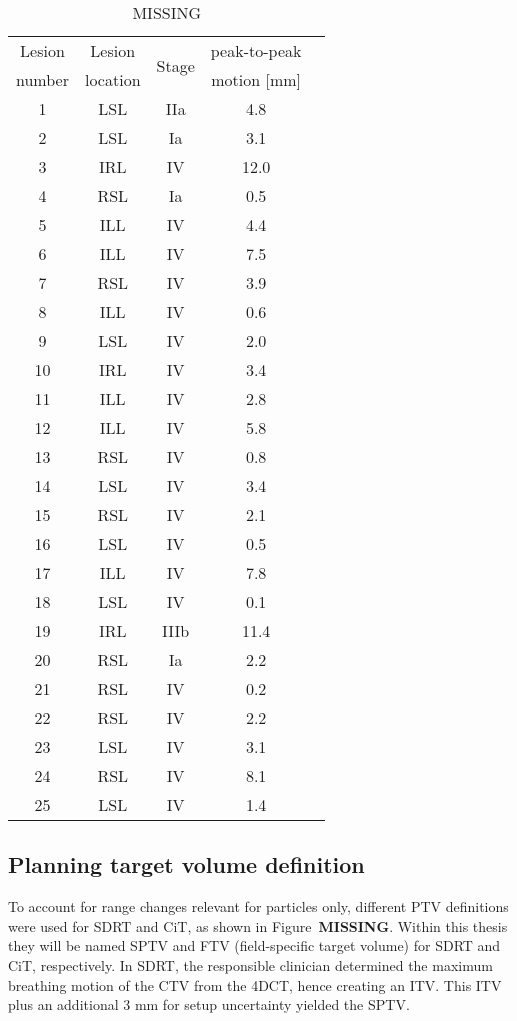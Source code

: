 \documentclass[type=dr, dr=rernat, accentcolor=tud7b,colorbacktitle, bigchapter, openright, twoside, 12pt ]{tudthesis}
\begin{document}
\begin{table}[H]
  \centering
  \caption{MISSING}
  \begin{tabular}{|c|c|c|c|c|}
    \hline\hline
    Lesion & Lesion & \multirow{2}{*}{Stage} &
    peak-to-peak \\
    number & location & & motion [mm] \\
    \hline
    1 & LSL & IIa & 4.8  \\
    2 & LSL & Ia & 3.1 \\
    3 & IRL & IV & 12.0 \\
    4 & RSL & Ia & 0.5 \\
    5 & ILL & IV & 4.4 \\
    6 & ILL & IV & 7.5 \\
    7 & RSL & IV & 3.9 \\
    8 & ILL & IV & 0.6 \\
    9 & LSL & IV & 2.0 \\
    10 & IRL & IV & 3.4 \\
    11 & ILL & IV & 2.8 \\
    12 & ILL & IV & 5.8 \\
    13 & RSL & IV & 0.8 \\
    14 & LSL & IV & 3.4 \\
    15 & RSL & IV & 2.1 \\
    16 & LSL & IV & 0.5 \\
    17 & ILL & IV & 7.8 \\
    18 & LSL & IV & 0.1 \\
    19 & IRL & IIIb & 11.4 \\
    20 & RSL & Ia & 2.2 \\
    21 & RSL & IV & 0.2 \\
    22 & RSL & IV & 2.2 \\
    23 & LSL & IV & 3.1 \\
    24 & RSL & IV & 8.1 \\
    25 & LSL & IV & 1.4 \\
    \hline\hline
  \end{tabular}
  \label{tab:patdata}
\end{table}

\subsection{Planning target volume definition}

To account for range changes relevant for particles only, different PTV definitions were used for SDRT and CiT, as shown in Figure~\textbf{MISSING}. 
Within this thesis they will be named SPTV and FTV (field-specific target volume) for SDRT and CiT, respectively.
In SDRT, the responsible clinician determined the maximum breathing motion of the CTV from the 4DCT, hence creating an ITV. This ITV plus an additional 3 mm for setup uncertainty yielded the SPTV.
\end{document}
